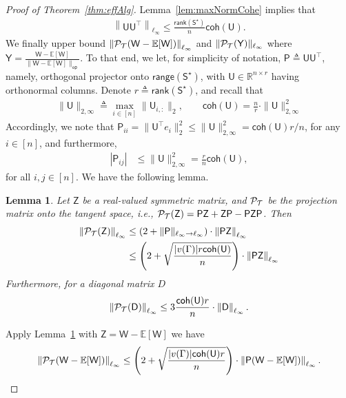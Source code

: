 \documentclass[12pt]{article}
\newcommand{\bE}{\mathbb{E}}
\newtheorem{lemma}{Lemma}
\newcommand{\calP}{{\cal P}}
\newcommand{\calT}{{\cal T}}
\newcommand{\p}[1]{\left(#1\right)}
\newcommand{\norm}[1]{\left\|#1\right\|}
\newcommand{\s}[1]{\mathsf{#1}}
\begin{document}
\begin{proof}[Proof of Theorem~\ref{thm:effAlg}]
Lemma~\ref{lem:maxNormCohe} implies that 
\begin{align}
    \norm{\s{U}\s{U}^\top}_{\ell_\infty}\leq \frac{\s{rank}(\s{S}^\star)}{n}\s{coh}(\s{U}).\label{eqn:SecondBoundCon}
\end{align}
We finally upper bound $\norm{\calP_{\calT}(\s{W}-\bE[\s{W}])}_{\ell_\infty}$ and $\|\calP_{\calT}(\s{Y})\|_{\ell_\infty}$ where $\s{Y} = \frac{\s{W}-\bE[\s{W}]}{\|\s{W}-\bE[\s{W}]\|_{\s{op}}}$. To that end, we let, for simplicity of notation, $\s{P}\triangleq \s{U}\s{U}^\top$, namely, orthogonal projector onto $\s{range}(\s{S}^\star)$, with $\s{U} \in \mathbb{R}^{n \times r}$ having orthonormal columns. Denote $r\triangleq\s{rank}(\s{S}^\star)$, and recall that
\begin{align}
\|\s{U}\|_{2,\infty} \triangleq \max_{i \in [n]} \|\s{U}_{i,:}\|_2, \qquad
\s{coh}(\s{U})=\frac{n}{r} \cdot \|\s{U}\|_{2,\infty}^2
\end{align}
Accordingly, we note that $\s{P}_{ii} = \|\s{U}^\top e_i\|_2^2 \leq \|\s{U}\|_{2,\infty}^2 = \s{coh}(\s{U}) r/n$, for any $i\in[n]$, and furthermore,
\begin{align}
|\s{P}_{ij}| &\leq \|\s{U}\|_{2,\infty}^2 = \frac{r}{n}\s{coh}(\s{U}),
\end{align}
for all $i,j\in[n]$. We have the following lemma.
\begin{lemma}\label{lem:infBoundSymY}
    Let $\s{Z}$ be a real-valued symmetric matrix, and $\calP_{\calT}$ be the projection matrix onto the tangent space, i.e., $\calP_{\calT}(\s{Z}) = \s{P}\s{Z}+\s{Z}\s{P}-\s{P}\s{Z}\s{P}$. Then
    \begin{align}
\norm{\calP_{\calT}(\s{Z})}_{\ell_\infty} &\leq(2 + \|\s{P}\|_{\ell_\infty \to \ell_\infty}) \cdot \norm{\s{P}\s{Z}}_{\ell_\infty}\\
&\leq\p{2 + \sqrt{ \frac{|v(\Gamma)| r \s{coh}(\s{U})}{n}}} \cdot \norm{\s{P}\s{Z}}_{\ell_\infty}\label{eqn:Epropo2}
\end{align}
Furthermore, for a diagonal matrix $D$
\begin{align}
\norm{\calP_{\calT}(\s{D})}_{\ell_\infty} \leq3\frac{\s{coh}(\s{U}) r}{n} \cdot\norm{\s{D}}_{\ell_\infty}.
\end{align}
\end{lemma}
Apply Lemma~\ref{lem:infBoundSymY} with $\s{Z} =  \s{W} - \bE[\s{W}]$ we have
\begin{align}
   \norm{\calP_{\calT}(\s{W}-\bE[\s{W}])}_{\ell_\infty}\leq\p{2 + \sqrt{ \frac{|v(\Gamma)|  \s{coh}(\s{U})r}{n}}} \cdot \norm{\s{P}(\s{W}-\bE[\s{W}])}_{\ell_\infty}.\label{eqn:ProjectionBound}

\end{align}
\end{proof}
\end{document}

